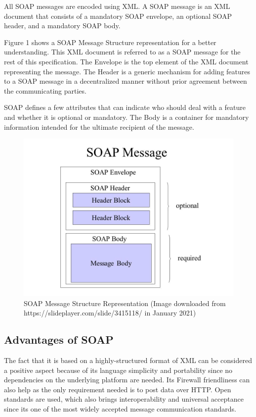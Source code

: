 \documentclass[conference]{IEEEtran}
\begin{document}
All SOAP messages are encoded using XML. A SOAP message is an XML document that consists of a mandatory SOAP envelope, an optional SOAP header, and a mandatory SOAP body. 

Figure 1 shows a SOAP Message Structure representation for a better understanding. This XML document is referred to as a SOAP message for the rest of this specification. The Envelope is the top element of the XML document representing the message. The Header is a generic mechanism for adding features to a SOAP message in a decentralized manner without prior agreement between the communicating parties. \cite{SOA-W3C-2000}

SOAP defines a few attributes that can indicate who should deal with a feature and whether it is optional or mandatory. The Body is a container for mandatory information intended for the ultimate recipient of the message.\cite{SOA-W3C-2000}

\begin{figure}
	\centering
	\includegraphics[width=0.8\linewidth]{soap_message.jpg}
	\caption{SOAP Message Structure Representation (Image downloaded from https://slideplayer.com/slide/3415118/ in January 2021)}
\end{figure}

\subsection{Advantages of SOAP}

The fact that it is based on a highly-structured format of XML can be considered a positive aspect because of its language simplicity and portability since no dependencies on the underlying platform are needed. Its Firewall friendliness can also help as the only requirement needed is to post data over HTTP. Open standards are used, which also brings interoperability and universal acceptance since its one of the most widely accepted message communication standards.
\end{document}
